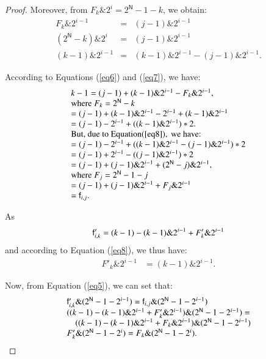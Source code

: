 \begin{proof}
Moreover, from $F_k\&2^i = 2^\mathsf{N}-1-k$, we obtain:
\begin{equation}
\label{eq7}
\begin{array}{lll}
F_k\&2^{i-1}&=&(j-1)\&2^{i-1} \\
(2^\mathsf{N}-k)\&2^i&=&(j-1)\&2^{i-1}\\
(k-1)\&2^{i-1}&=&(k-1)\&2^{i-1}-(j-1)\&2^{i-1}.
\end{array}
\end{equation}

According to Equations (\ref{eq6}) and (\ref{eq7}), we have:
\begin{equation}
\label{eq8}
\begin{array}{ll}
k-1=(j-1)+(k-1)\&2^{i-1}-F_k\&2^{i-1}, \\
\text{where } F_k=2^\mathsf{N}-k \\
 =(j-1)+(k-1)\&2^{i-1}-2^{i-1}+(k-1)\&2^{i-1}\\
 =(j-1)-2^{i-1}+((k-1)\&2^{i-1})*2. \\
\text{But, due to Equation} (\ref{eq8}), \text{ we have:} \\
 =(j-1)-2^{i-1}+((k-1)\&2^{i-1}-(j-1)\&2^{i-1})*2 \\
 =(j-1)+2^{i-1}-((j-1)\&2^{i-1})*2 \\
 =(j-1)+(j-1)\&2^{i-1}+(2^\mathsf{N}-j)\&2^{i-1},\\
\text{where } F_j=2^\mathsf{N}-1-j \\
 =(j-1)+(j-1)\&2^{i-1}+F_j\&2^{i-1} \\
 =\mathsf{f}_{i,j}.
\end{array}
\end{equation}

As
\begin{equation}
\mathsf{f}'_{i,k}=(k-1)-(k-1)\&2^{i-1}+F'_k\&2^{i-1}\\
\end{equation}
and according to Equation (\ref{eq8}), we thus have:
\begin{equation}
\label{eq9}
\begin{array}{ll}
F'_k\&2^{i-1} &=(k-1)\&2^{i-1}.
\end{array}
\end{equation} 

Now, from Equation (\ref{eq5}), we can set that:
\begin{equation}
\label{eq10}
\begin{array}{lr}
\mathsf{f}'_{i,k}\&(2^\mathsf{N}-1-2^{i-1})=\mathsf{f}_{i,j}\&(2^\mathsf{N}-1-2^{i-1}) \\
\multicolumn{2}{l}{((k-1)-(k-1)\&2^{i-1}+F'_k\&2^{i-1})\&(2^\mathsf{N}-1-2^{i-1})=}\\
~~~~((k-1)-(k-1)\&2^{i-1}+F_k\&2^{i-1})\&(2^\mathsf{N}-1-2^{i-1}) \\
F'_k\&(2^\mathsf{N}-1-2^i)=F_k\&(2^\mathsf{N}-1-2^i).\\
\end{array}
\end{equation}


\end{proof}
